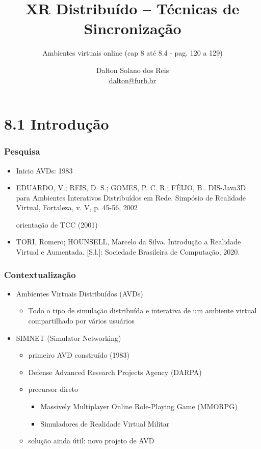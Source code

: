 \documentclass{beamer}
\title[XR Distribuído – Técnicas de Sincronização]{XR Distribuído – Técnicas de Sincronização}
\subtitle{Ambientes virtuais online (cap 8 até 8.4 - pag. 120 a 129)}
\author[Dalton Solano dos Reis]{
  Dalton Solano dos Reis\texorpdfstring{\\\medskip}{}%
  {\small \href{mailto:dalton@furb.br}{dalton@furb.br}}}
\institute[UDESC]{
  Centro de Ciências e Tecnológicas\\
  Universidade do Estado de Santa Catarina}
\begin{document}
\begin{frame}
  \titlepage

\end{frame}

\section{8.1 Introdução}

\begin{frame}
  \frametitle{Pesquisa}
  \begin{itemize}
    \item Inicio AVDs: 1983
    \item EDUARDO, V.; REIS, D. S.; GOMES, P. C. R.; FÉIJO, B.. DIS-Java3D para Ambientes Interativos Distribuídos em Rede. Simpósio de Realidade Virtual, Fortaleza, v. V, p. 45-56, 2002
    \begin{flushright}
      \scriptsize
      orientação de TCC (2001)
    \end{flushright}
    \item TORI, Romero; HOUNSELL, Marcelo da Silva. Introdução a Realidade Virtual e Aumentada. [S.l.]: Sociedade Brasileira de Computação, 2020. 
  \end{itemize}
\end{frame}

\begin{frame}
  \frametitle{Contextualização}
    \begin{itemize}
      \item Ambientes Virtuais Distribuídos (AVDs)
      \begin{itemize}
        \item Todo o tipo de simulação distribuída e interativa de um ambiente virtual compartilhado por vários usuários
      \end{itemize}
      \item SIMNET (Simulator Networking)
      \begin{itemize}
        \item primeiro AVD construído (1983)
        \item Defense Advanced Research Projects Agency (DARPA)
        \item precursor direto
        \begin{itemize}
          \item Massively Multiplayer Online Role-Playing Game (MMORPG)
          \item Simuladores de Realidade Virtual Militar
        \end{itemize}
        \item solução ainda útil: novo projeto de AVD
      \end{itemize} 
    \end{itemize}
\end{frame}
\end{document}

